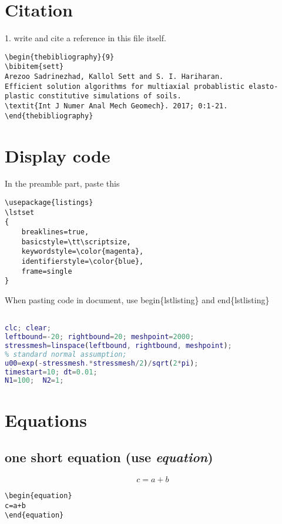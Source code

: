 \documentclass[12pt]{article}
\begin{document}
\section{Citation}

1. write and cite a reference in this file itself. \cite{sett}
\begin{lstlisting}
\begin{thebibliography}{9}
\bibitem{sett} 
Arezoo Sadrinezhad, Kallol Sett and S. I. Hariharan. 
Efficient solution algorithms for multiaxial probablistic elasto-plastic constitutive simulations of soils.
\textit{Int J Numer Anal Mech Geomech}. 2017; 0:1-21.
\end{thebibliography}
\end{lstlisting}


\section{Display code}
In the preamble part, paste this
\begin{lstlisting}
\usepackage{listings}
\lstset
{
    breaklines=true,
    basicstyle=\tt\scriptsize,
    keywordstyle=\color{magenta},
    identifierstyle=\color{blue},
    frame=single
}
\end{lstlisting}

When pasting code in document, use begin\{lstlisting\} and end\{lstlisting\}

\begin{lstlisting}[language=Matlab]

clc; clear;
leftbound=-20; rightbound=20; meshpoint=2000;
stressmesh=linspace(leftbound, rightbound, meshpoint);
% standard normal assumption;
u00=exp(-stressmesh.*stressmesh/2)/sqrt(2*pi); 
timestart=10; dt=0.01;
N1=100;  N2=1;        

\end{lstlisting}



\section{Equations}

\subsection{one short equation (use \textit{equation})}
\begin{equation}
c=a+b
\end{equation}

\begin{lstlisting}
\begin{equation}
c=a+b
\end{equation}
\end{lstlisting}
\end{document}
